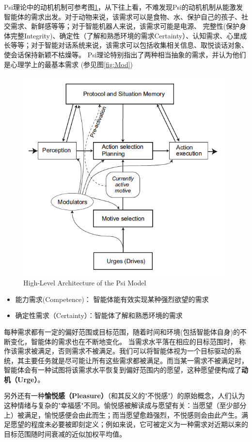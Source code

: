 Psi理论中的动机机制可参考图\ref{fig:Psi}，从下往上看，不难发现Psi的动机机制从能激发智能体的需求出发。对于动物来说，该需求可以是食物、水、保护自己的孩子、社交需求、新鲜感等等；对于智能机器人来说，该需求可能是电源、 完整性(保护身体完整Integrity)、确定性（了解和熟悉环境的需求Certainty）、认知需求、心里成长等等；对于智能对话系统来说，该需求可以包括收集相关信息、取悦谈话对象、使会话保持新颖不枯燥等。
Psi理论特别指出了两种相当抽象的需求，并认为他们是心理学上的最基本需求 (参见图\ref{fig:Mod})

\begin{figure}[htb]
\centering
\includegraphics[width=11cm]{figures/Psi.png}
\caption{High-Level Architecture of the Psi Model}
\label{fig:Psi}
\end{figure}

\begin{itemize}
\item 能力需求(Competence)：  智能体能有效实现某种强烈欲望的需求
\item 确定性需求（Certainty）：智能体了解和熟悉环境的需求 
\end{itemize}

每种需求都有一定的偏好范围或目标范围，随着时间和环境(包括智能体自身)的不断变化，智能体的需求也在不断地变化。 当需求水平落在相应的目标范围时，
称作该需求被满足，否则需求不被满足。我们可以将智能体视为一个目标驱动的系统，其主要任务就是尽可能让所有这些需求都被满足。而当某一需求不被满足时，智能体会有一种试图将该需求水平恢复到偏好范围内的愿望，这种愿望便构成了{\bf 动机（Urge）}。


另外还有一种{\bf 愉悦感（Pleasure）}（和其反义的"不悦感"）的原始概念，人们认为这种情绪与复杂的"幸福感"不同。愉悦感被解读成与愿望有关：当愿望（至少部分上）被满足，愉悦感便会由此而生；而当愿望愈趋强烈，不悦感则会由此产生。满足愿望的程度未必要被即刻定义；例如来说，它可被定义为一种需求对近期以来的目标范围随时间衰减的近似加权平均值。

